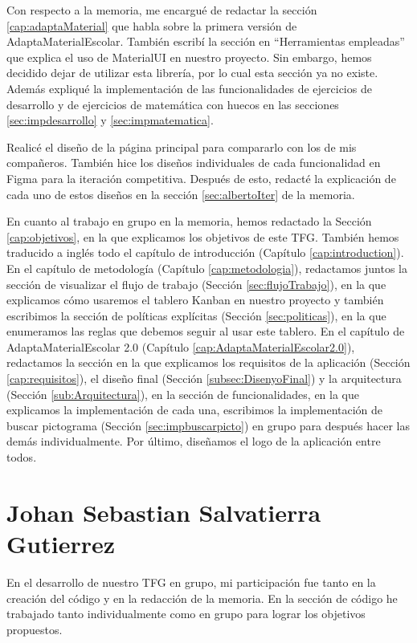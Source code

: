 Con respecto a la memoria, me encargué de redactar la sección \ref{cap:adaptaMaterial} que habla sobre la primera versión de AdaptaMaterialEscolar. También escribí la sección en “Herramientas empleadas” que explica el uso de MaterialUI en nuestro proyecto. Sin embargo, hemos decidido dejar de utilizar esta librería, por lo cual esta sección ya no existe. Además expliqué la implementación de las funcionalidades de ejercicios de desarrollo y de ejercicios de matemática con huecos en las secciones \ref{sec:impdesarrollo} y \ref{sec:impmatematica}.

Realicé el diseño de la página principal para compararlo con los de mis compañeros. También hice los diseños individuales de cada funcionalidad en Figma para la iteración competitiva. Después de esto, redacté la explicación de cada uno de estos diseños en la sección \ref{sec:albertoIter} de la memoria.

En cuanto al trabajo en grupo en la memoria, hemos redactado la Sección \ref{cap:objetivos}, en la que explicamos los objetivos de este TFG. También hemos traducido a inglés todo el capítulo de introducción (Capítulo \ref{cap:introduction}). En el capítulo de metodología (Capítulo \ref{cap:metodologia}), redactamos juntos la sección de visualizar el flujo de trabajo (Sección \ref{sec:flujoTrabajo}), en la que explicamos cómo usaremos el tablero Kanban en nuestro proyecto y también escribimos la sección de políticas explícitas (Sección \ref{sec:politicas}), en la que enumeramos las reglas que debemos seguir al usar este tablero. En el capítulo de AdaptaMaterialEscolar 2.0 (Capítulo \ref{cap:AdaptaMaterialEscolar2.0}), redactamos la sección en la que explicamos los requisitos de la aplicación (Sección \ref{cap:requisitos}), el diseño final (Sección \ref{subsec:DisenyoFinal}) y la arquitectura (Sección \ref{sub:Arquitectura}), en la sección de funcionalidades, en la que explicamos la implementación de cada una, escribimos la implementación de buscar pictograma (Sección \ref{sec:impbuscarpicto}) en grupo para después hacer las demás individualmente. Por último, diseñamos el logo de la aplicación entre todos.


\section{Johan Sebastian Salvatierra Gutierrez}
En el desarrollo de nuestro TFG en grupo, mi participación fue tanto en la creación del código y en la redacción de la memoria. En la sección de código he trabajado tanto individualmente como en grupo para lograr los objetivos propuestos.

